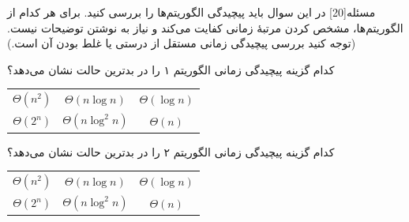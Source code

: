 ‌مسئله[20] در این سوال باید پیچیدگی الگوریتم‌ها را بررسی کنید. برای هر کدام از الگوریتم‌ها، مشخص کردن مرتبۀ زمانی کفایت می‌کند و نیاز به نوشتن توضیحات نیست. (توجه کنید بررسی پیچیدگی زمانی مستقل از درستی یا غلط بودن آن است.)

 کدام گزینه پیچیدگی زمانی الگوریتم ۱
را در بدترین حالت نشان می‌دهد؟
\begin{large}
	\begin{center}
		\begin{tabular}{c c c}
			$\Theta(n^2)$ & $\Theta(n \log n)$ & $\Theta(\log n)$\\
			$\Theta(2^n)$ &	$\Theta(n\log^2 n)$ & $\Theta(n)$\\
		\end{tabular}
	\end{center}
\end{large}

%
%
%
%
%
%


 کدام گزینه پیچیدگی زمانی الگوریتم ۲
را در بدترین حالت نشان می‌دهد؟

\begin{large}
	\begin{center}
		\begin{tabular}{c c c}
			$\Theta(n^2)$ & $\Theta(n \log n)$ & $\Theta(\log n)$\\
			$\Theta(2^n)$ &	$\Theta(n\log^2 n)$ & $\Theta(n)$\\
		\end{tabular}
	\end{center}
\end{large}


%
%
%
%
%
%
%


